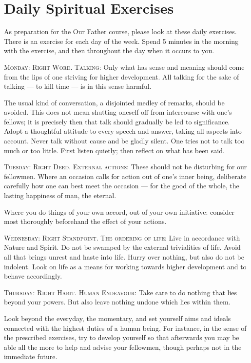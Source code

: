 \chapter{Daily Spiritual Exercises}

As preparation for the Our Father course, please look at these daily exercises. There is an exercise for each day of the
week. Spend 5 minutes in the morning with the exercise, and then throughout the day when it occurs to you.

\textsc{Monday: Right Word. Talking}: Only what has sense and meaning should come from the lips of one striving for higher development. All
talking for the sake of talking — to kill time — is in this sense harmful.

The usual kind of conversation, a disjointed medley of remarks, should be avoided. This does not mean shutting oneself
off from intercourse with one's fellows; it is precisely then that talk should gradually be led to
significance. Adopt a thoughtful attitude to every speech and answer, taking all aspects into account. Never talk
without cause and be gladly silent. One tries not to talk too much or too little. First listen quietly; then reflect on
what has been said.

\textsc{Tuesday: Right Deed. External actions}: These should not be disturbing for our fellowmen. Where an occasion calls for action out of
one's inner being, deliberate carefully how one can best meet the occasion —
for the good of the whole, the lasting happiness of man, the eternal.

Where you do things of your own accord, out of your own initiative: consider most thoroughly beforehand the effect of
your actions.

\textsc{Wednesday: Right Standpoint. The ordering of life}: Live in accordance with Nature and Spirit. Do not be swamped by the external trivialities
of life. Avoid all that brings unrest and haste into life. Hurry over nothing, but also do not be indolent. Look on
life as a means for working towards higher development and to behave accordingly.

\textsc{Thursday: Right Habit. Human Endeavour}: Take care to do nothing that lies beyond your powers. But also leave nothing undone which lies
within them.

Look beyond the everyday, the momentary, and set yourself aims and ideals connected with the highest duties of a human
being. For instance, in the sense of the prescribed exercises, try to develop yourself so that afterwards you may be
able all the more to help and advise your fellowmen, though perhaps not in the immediate future.


